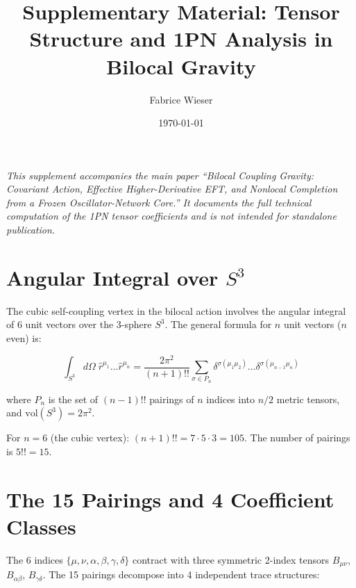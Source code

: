 \documentclass[aps,prd,onecolumn,superscriptaddress]{revtex4-2}
\begin{document}
\title{Supplementary Material: Tensor Structure and 1PN Analysis in Bilocal Gravity}

\author{Fabrice Wieser}

\date{\today}

\maketitle

\noindent\textit{This supplement accompanies the main paper ``Bilocal Coupling Gravity: Covariant Action, Effective Higher-Derivative EFT, and Nonlocal Completion from a Frozen Oscillator-Network Core.'' It documents the full technical computation of the 1PN tensor coefficients and is not intended for standalone publication.}

\section{Angular Integral over $S^3$}
\label{sec:S1}

The cubic self-coupling vertex in the bilocal action involves the angular integral of 6 unit vectors over the 3-sphere $S^3$. The general formula for $n$ unit vectors ($n$ even) is:

\begin{equation}
\int_{S^3} d\Omega\; \hat{r}^{\mu_1}\ldots\hat{r}^{\mu_n}
= \frac{2\pi^2}{(n+1)!!}
\sum_{\sigma \in P_n} \delta^{\sigma(\mu_1\mu_2)}\ldots\delta^{\sigma(\mu_{n-1}\mu_n)}
\label{eq:S1}
\end{equation}

where $P_n$ is the set of $(n-1)!!$ pairings of $n$ indices into $n/2$ metric tensors, and $\text{vol}(S^3) = 2\pi^2$.

For $n = 6$ (the cubic vertex): $(n+1)!! = 7\cdot 5\cdot 3 = 105$. The number of pairings is $5!! = 15$.

\section{The 15 Pairings and 4 Coefficient Classes}
\label{sec:S2}

The 6 indices $\{\mu,\nu,\alpha,\beta,\gamma,\delta\}$ contract with three symmetric 2-index tensors $B_{\mu\nu}$, $B_{\alpha\beta}$, $B_{\gamma\delta}$. The 15 pairings decompose into 4 independent trace structures:
\end{document}
